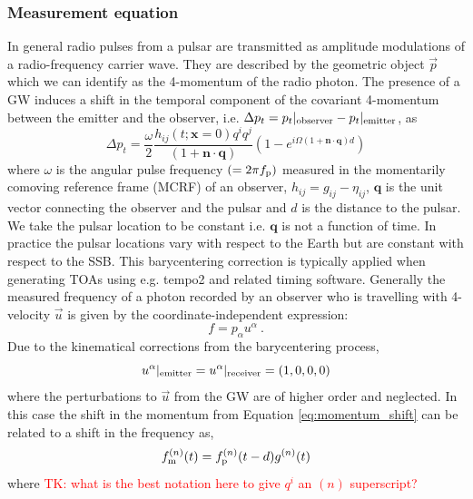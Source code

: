 \documentclass[fleqn,usenatbib,useAMS]{mnras}
\begin{document}
\subsubsection{Measurement equation}
In general radio pulses from a pulsar are transmitted as amplitude modulations of a radio-frequency carrier wave. They are described by the geometric object $\vec{p}$ which we can identify  as the 4-momentum of the radio photon. The presence of a GW induces a shift in the temporal component of the covariant 4-momentum between the emitter and the observer, i.e. $\Delta p_t = p_t|_{\rm observer} - p_t|_{\rm emitter} $, as \citep[e.g.][]{Maggiore}
\begin{equation}
 \Delta p_t = \frac{\omega}{2} \frac{ h_{ij} (t; \boldsymbol{x}= 0)q^i q^j }{(1 + \boldsymbol{n}\cdot \boldsymbol{q}) }  \left(1 -e^{i \Omega (1 + \boldsymbol{n}\cdot \boldsymbol{q})  d}\right)
	\label{eq:momentum_shift}
\end{equation}
where $\omega$ is the angular pulse frequency $(= 2 \pi f_{\rm p})$ measured in the momentarily comoving reference frame (MCRF) of an observer, $h_{ij} = g_{ij} - \eta_{ij}$, $\boldsymbol{q}$ is the unit vector connecting the observer and the pulsar and $d$ is the distance to the pulsar. We take the pulsar location to be constant i.e.  $\boldsymbol{q}$ is not a function of time. In practice the pulsar locations vary with respect to the Earth but are constant with respect to the SSB. This barycentering correction is typically applied when generating TOAs using e.g. {\sc tempo2} and related timing software. Generally the measured frequency of a photon recorded by an observer who is travelling with 4-velocity $\vec{u}$ is given by the coordinate-independent expression:
\begin{equation}
	f = p_{\alpha} u^{\alpha} \ . 
	\label{eq:freq_temporal}
\end{equation}
Due to the kinematical corrections from the barycentering process, 
\begin{equation}
	u^{\alpha}|_{\rm emitter} = u^{\alpha}|_{\rm receiver} = (1,0,0,0)
\end{equation}
where the perturbations to $\vec{u}$ from the GW are of higher order and neglected. In this case the shift in the momentum from Equation \ref{eq:momentum_shift} can be related to a shift in the frequency as,
\begin{equation}
	f_{\rm m}^{(n)}(t) = f_{\rm p}^{(n)}(t-d) g^{(n)}(t)
	\label{eq:measurement}
\end{equation}
where \textcolor{red}{TK: what is the best notation here to give $q^i$ an $(n)$ superscript?}
\end{document}
